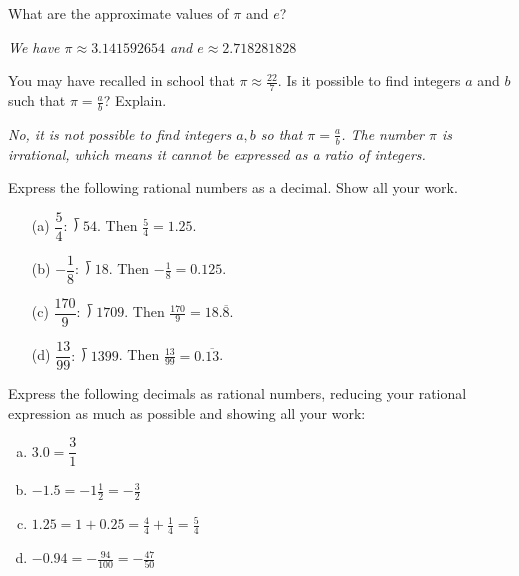 \documentclass[11pt,letterpaper]{article}
\begin{document}

 What are the approximate values of $\pi$ and $e$? \pvspace{1cm}

{\itshape We have $\pi \approx 3.141592654$ and $e \approx 2.718281828$} \pvspace{1.5cm}





 You may have recalled in school that $\pi \approx \frac{22}{7}$. Is it possible to find integers $a$ and $b$ such that $\pi= \frac{a}{b}$? Explain. \pvspace{1.4cm}

{\itshape No, it is not possible to find integers $a, b$ so that $\pi= \frac{a}{b}$. The number $\pi$ is irrational, which means it cannot be expressed as a ratio of integers.} \pvspace{1.7cm}





 Express the following rational numbers as a decimal. Show all your work. \pspace

\begin{minipage}[t]{0.49\textwidth}
\begin{enumerate}
\item[(a)] $\dfrac{5}{4}: \longdivision{5}{4}$. Then $\frac{5}{4}= 1.25$. \vfill
\item[(b)] $-\dfrac{1}{8}: \longdivision{1}{8}$. Then $-\frac{1}{8}= 0.125$. \vfill
\end{enumerate}
\end{minipage}
\begin{minipage}[t]{0.49\textwidth}
\begin{enumerate}
\item[(c)] $\dfrac{170}{9}: \longdivision{170}{9}$. Then $\frac{170}{9}= 18.\overline{8}$. \vfill
\item[(d)] $\dfrac{13}{99}: \longdivision{13}{99}$. Then $\frac{13}{99}= 0.\overline{13}$. \vfill
\end{enumerate}
\end{minipage}





\newpage





 Express the following decimals as rational numbers, reducing your rational expression as much as possible and showing all your work: \pspace
\begin{enumerate}[(a)]
\item $3.0= \dfrac{3}{1}$ \pvspace{1cm}
\item $-1.5= -1\frac{1}{2}= -\frac{3}{2}$ \pvspace{1cm}
\item $1.25= 1 + 0.25= \frac{4}{4} + \frac{1}{4}= \frac{5}{4}$ \pvspace{1cm}
\item $-0.94= - \frac{94}{100}= -\frac{47}{50}$ \pvspace{1cm}
\end{enumerate}
\end{document}
